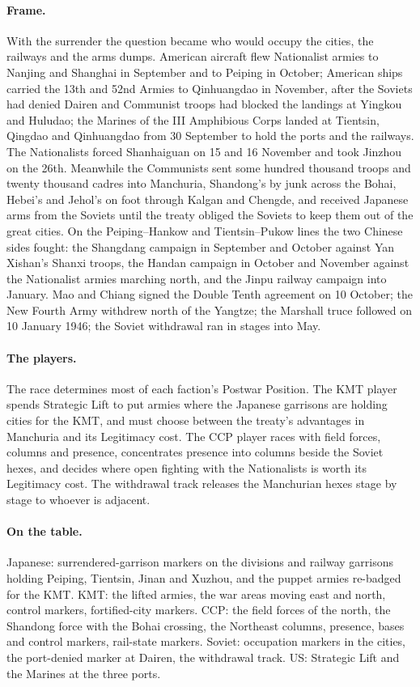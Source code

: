 \documentclass[11pt]{article}
\begin{document}
\paragraph{Frame.} With the surrender the question became who would occupy the cities, the railways and the arms dumps. American aircraft flew Nationalist armies to Nanjing and Shanghai in September and to Peiping in October; American ships carried the 13th and 52nd Armies to Qinhuangdao in November, after the Soviets had denied Dairen and Communist troops had blocked the landings at Yingkou and Huludao; the Marines of the III Amphibious Corps landed at Tientsin, Qingdao and Qinhuangdao from 30 September to hold the ports and the railways. The Nationalists forced Shanhaiguan on 15 and 16 November and took Jinzhou on the 26th. Meanwhile the Communists sent some hundred thousand troops and twenty thousand cadres into Manchuria, Shandong's by junk across the Bohai, Hebei's and Jehol's on foot through Kalgan and Chengde, and received Japanese arms from the Soviets until the treaty obliged the Soviets to keep them out of the great cities. On the Peiping--Hankow and Tientsin--Pukow lines the two Chinese sides fought: the Shangdang campaign in September and October against Yan Xishan's Shanxi troops, the Handan campaign in October and November against the Nationalist armies marching north, and the Jinpu railway campaign into January. Mao and Chiang signed the Double Tenth agreement on 10 October; the New Fourth Army withdrew north of the Yangtze; the Marshall truce followed on 10 January 1946; the Soviet withdrawal ran in stages into May.
\paragraph{The players.} The race determines most of each faction's Postwar Position. The KMT player spends Strategic Lift to put armies where the Japanese garrisons are holding cities for the KMT, and must choose between the treaty's advantages in Manchuria and its Legitimacy cost. The CCP player races with field forces, columns and presence, concentrates presence into columns beside the Soviet hexes, and decides where open fighting with the Nationalists is worth its Legitimacy cost. The withdrawal track releases the Manchurian hexes stage by stage to whoever is adjacent.
\paragraph{On the table.} Japanese: surrendered-garrison markers on the divisions and railway garrisons holding Peiping, Tientsin, Jinan and Xuzhou, and the puppet armies re-badged for the KMT. KMT: the lifted armies, the war areas moving east and north, control markers, fortified-city markers. CCP: the field forces of the north, the Shandong force with the Bohai crossing, the Northeast columns, presence, bases and control markers, rail-state markers. Soviet: occupation markers in the cities, the port-denied marker at Dairen, the withdrawal track. US: Strategic Lift and the Marines at the three ports.
\end{document}
